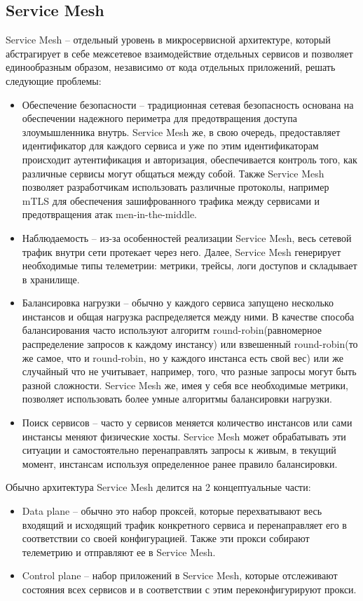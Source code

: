 \subsection{Service Mesh}
Service Mesh -- отдельный уровень в микросервисной архитектуре, который абстрагирует в себе межсетевое взаимодействие отдельных сервисов и позволяет единообразным образом, независимо от кода отдельных приложений, решать следующие проблемы:

\begin{itemize}
	\item Обеспечение безопасности -- традиционная сетевая безопасность основана на обеспечении надежного периметра для предотвращения доступа злоумышленника внутрь. Service Mesh же, в свою очередь, предоставляет идентификатор для каждого сервиса и уже по этим идентификаторам происходит аутентификация и авторизация, обеспечивается контроль того,  как различные сервисы могут общаться между собой. Также Service Mesh позволяет разработчикам использовать различные протоколы, например mTLS для обеспечения зашифрованного трафика между сервисами и предотвращения атак men-in-the-middle.
	\item Наблюдаемость -- из-за особенностей реализации Service Mesh, весь сетевой трафик внутри сети протекает через него. Далее, Service Mesh генерирует необходимые типы телеметрии: метрики, трейсы, логи доступов и складывает в хранилище.
	\item Балансировка нагрузки -- обычно у каждого сервиса запущено несколько инстансов и общая нагрузка распределяется между ними. В качестве способа балансирования часто используют алгоритм round-robin(равномерное распределение запросов к каждому инстансу) или взвешенный round-robin(то же самое, что и round-robin, но у каждого инстанса есть свой вес) или же случайный что не учитывает, например, того, что разные запросы могут быть разной сложности. Service Mesh же, имея у себя все необходимые метрики, позволяет использовать более умные алгоритмы балансировки нагрузки.
	\item Поиск сервисов -- часто у сервисов меняется количество инстансов или сами инстансы меняют физические хосты. Service Mesh может обрабатывать эти ситуации и самостоятельно перенаправлять запросы к живым, в текущий момент, инстансам используя определенное ранее правило балансировки.
\end{itemize}

Обычно архитектура Service Mesh делится на 2 концептуальные части:
\begin{itemize}
	\item Data plane -- обычно это набор проксей, которые перехватывают весь входящий и исходящий трафик конкретного сервиса и перенаправляет его в соответствии со своей конфигурацией. Также эти прокси собирают телеметрию и отправляют ее в Service Mesh.
	\item Control plane -- набор приложений в Service Mesh, которые отслеживают состояния всех сервисов и в соответствии с этим переконфигурируют прокси.
\end{itemize}

